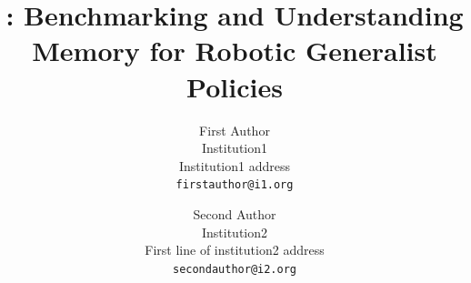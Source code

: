 \documentclass[10pt,twocolumn,letterpaper]{article}
\title{\benchname: Benchmarking and Understanding Memory for Robotic Generalist Policies}
\author{First Author\\
Institution1\\
Institution1 address\\
{\tt\small firstauthor@i1.org}
\and
Second Author\\
Institution2\\
First line of institution2 address\\
{\tt\small secondauthor@i2.org}
}
\begin{document}
\maketitle









{
    \small
    
    
}

% 
\end{document}
